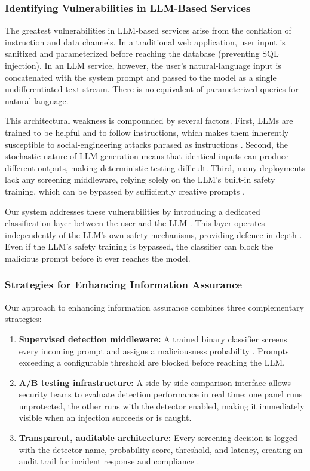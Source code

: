 \documentclass[12pt, letterpaper]{article}   %
\begin{document}
\subsubsection{Identifying Vulnerabilities in LLM-Based Services}

The greatest vulnerabilities in LLM-based services arise from the conflation of instruction and data channels. In a traditional web application, user input is sanitized and parameterized before reaching the database (preventing SQL injection). In an LLM service, however, the user's natural-language input is concatenated with the system prompt and passed to the model as a single undifferentiated text stream. There is no equivalent of parameterized queries for natural language.

This architectural weakness is compounded by several factors. First, LLMs are trained to be helpful and to follow instructions, which makes them inherently susceptible to social-engineering attacks phrased as instructions \cite{ref9}\cite{ref20}. Second, the stochastic nature of LLM generation means that identical inputs can produce different outputs, making deterministic testing difficult. Third, many deployments lack any screening middleware, relying solely on the LLM's built-in safety training, which can be bypassed by sufficiently creative prompts \cite{ref3}\cite{ref40}.

Our system addresses these vulnerabilities by introducing a dedicated classification layer between the user and the LLM \cite{ref38}\cite{ref37}. This layer operates independently of the LLM's own safety mechanisms, providing defence-in-depth \cite{ref18}\cite{ref7}. Even if the LLM's safety training is bypassed, the classifier can block the malicious prompt before it ever reaches the model.

\subsubsection{Strategies for Enhancing Information Assurance}

Our approach to enhancing information assurance combines three complementary strategies:

\begin{enumerate}
    \item \textbf{Supervised detection middleware:} A trained binary classifier screens every incoming prompt and assigns a maliciousness probability \cite{ref37}\cite{ref1}. Prompts exceeding a configurable threshold are blocked before reaching the LLM.
    \item \textbf{A/B testing infrastructure:} A side-by-side comparison interface allows security teams to evaluate detection performance in real time: one panel runs unprotected, the other runs with the detector enabled, making it immediately visible when an injection succeeds or is caught.
    \item \textbf{Transparent, auditable architecture:} Every screening decision is logged with the detector name, probability score, threshold, and latency, creating an audit trail for incident response and compliance \cite{ref32}.
\end{enumerate}
\end{document}
